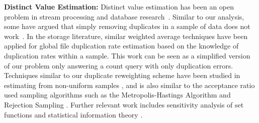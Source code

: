 \vspace{.5em}

{\noindent \bf Distinct Value Estimation:}
Distinct value estimation has been an open problem in stream processing and database research~\cite{considine2004approximate,bar2002counting,haas1995sampling,beyer2007synopses}.
Similar to our analysis, some have argued that simply removing duplicates in a sample of data does not work~\cite{charikar2000towards}.
In the storage literature, similar weighted average techniques have been applied for global file duplication rate estimation \cite{harnik2012estimation} based on the knowledge of duplication rates within a sample.
This work can be seen as a simplified version of our problem only answering a count query with only duplication errors.
Techniques similar to our duplicate reweighting scheme have been studied in estimating from non-uniform samples \cite{aldroubi2002non}, and is also similar to the acceptance ratio used sampling algorithms such as the Metropolis-Hastings Algorithm and Rejection Sampling \cite{liu1996metropolized,metropolis1953equation}.
Further relevant work includes sensitivity analysis of set functions \cite{mcdiarmid1989method, jukna2012analysis} and statistical information theory \cite{kullback1997information}. 

